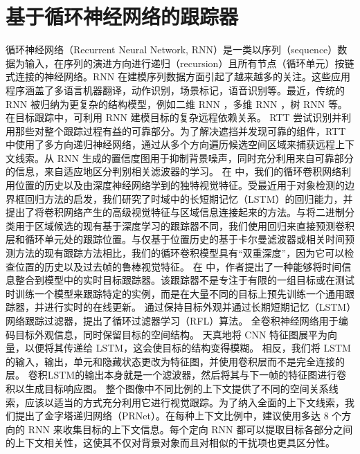 \section{基于循环神经网络的跟踪器}
循环神经网络（Recurrent Neural Network, RNN）是一类以序列（sequence）数据为输入，在序列的演进方向进行递归（recursion）且所有节点（循环单元）按链式连接的神经网络。RNN 在建模序列数据方面引起了越来越多的关注。这些应用程序涵盖了多语言机器翻译，动作识别，场景标记，语音识别等。最近，传统的 RNN 被归纳为更复杂的结构模型，例如二维 RNN \cite{shuai2015quaddirectional}，多维 RNN \cite{stollenga2015parallel}，树 RNN \cite{tai2015improved} 等。在目标跟踪中，可利用 RNN 建模目标的复杂远程依赖关系。
RTT \cite{RTT} 尝试识别并利用那些对整个跟踪过程有益的可靠部分。为了解决遮挡并发现可靠的组件，RTT 中使用了多方向递归神经网络，通过从多个方向遍历候选空间区域来捕获远程上下文线索。从 RNN 生成的置信度图用于抑制背景噪声，同时充分利用来自可靠部分的信息，来自适应地区分判别相关滤波器的学习。%
在 \cite{SpatiallySupervised} 中，我们的循环卷积网络利用位置的历史以及由深度神经网络学到的独特视觉特征。受最近用于对象检测的边界框回归方法的启发，我们研究了时域中的长短期记忆（LSTM）的回归能力，并提出了将卷积网络产生的高级视觉特征与区域信息连接起来的方法。与将二进制分类用于区域候选的现有基于深度学习的跟踪器不同，我们使用回归来直接预测卷积层和循环单元处的跟踪位置。与仅基于位置历史的基于卡尔曼滤波器或相关时间预测方法的现有跟踪方法相比，我们的循环卷积模型具有“双重深度”，因为它可以检查位置的历史以及过去帧的鲁棒视觉特征。%
在 \cite{gordon2018re} 中，作者提出了一种能够将时间信息整合到模型中的实时目标跟踪器。该跟踪器不是专注于有限的一组目标或在测试时训练一个模型来跟踪特定的实例，而是在大量不同的目标上预先训练一个通用跟踪器，并进行实时的在线更新。%
\cite{RecurrentFilter} 通过保持目标外观并通过长期短期记忆（LSTM）网络跟踪过滤器，提出了循环过滤器学习（RFL）算法。 全卷积神经网络用于编码目标外观信息，同时保留目标的空间结构。 天真地将 CNN 特征图展平为向量，以便将其传递给 LSTM，这会使目标的结构变得模糊。 相反，我们将 LSTM 的输入，输出，单元和隐藏状态更改为特征图，并使用卷积层而不是完全连接的层。 卷积LSTM的输出本身就是一个滤波器，然后将其与下一帧的特征图进行卷积以生成目标响应图。%
\cite{PRNet} 整个图像中不同比例的上下文提供了不同的空间关系线索，应该以适当的方式充分利用它进行视觉跟踪。为了纳入全面的上下文线索，我们提出了金字塔递归网络（PRNet）。在每种上下文比例中，建议使用多达 8 个方向的 RNN 来收集目标的上下文信息。每个定向 RNN 都可以提取目标各部分之间的上下文相关性，这使其不仅对背景对象而且对相似的干扰项也更具区分性。 %
